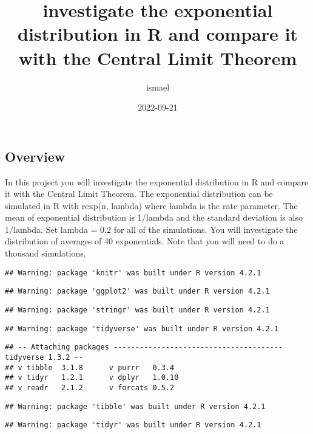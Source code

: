 \documentclass[
]{article}
\title{investigate the exponential distribution in R and compare it with
the Central Limit Theorem}
\author{ismael}
\date{2022-09-21}
\begin{document}
\maketitle

\hypertarget{overview}{%
\subsection{Overview}\label{overview}}

In this project you will investigate the exponential distribution in R
and compare it with the Central Limit Theorem. The exponential
distribution can be simulated in R with rexp(n, lambda) where lambda is
the rate parameter. The mean of exponential distribution is 1/lambda and
the standard deviation is also 1/lambda. Set lambda = 0.2 for all of the
simulations. You will investigate the distribution of averages of 40
exponentials. Note that you will need to do a thousand simulations.

\begin{verbatim}
## Warning: package 'knitr' was built under R version 4.2.1
\end{verbatim}

\begin{verbatim}
## Warning: package 'ggplot2' was built under R version 4.2.1
\end{verbatim}

\begin{verbatim}
## Warning: package 'stringr' was built under R version 4.2.1
\end{verbatim}

\begin{verbatim}
## Warning: package 'tidyverse' was built under R version 4.2.1
\end{verbatim}

\begin{verbatim}
## -- Attaching packages --------------------------------------- tidyverse 1.3.2 --
## v tibble  3.1.8      v purrr   0.3.4 
## v tidyr   1.2.1      v dplyr   1.0.10
## v readr   2.1.2      v forcats 0.5.2
\end{verbatim}

\begin{verbatim}
## Warning: package 'tibble' was built under R version 4.2.1
\end{verbatim}

\begin{verbatim}
## Warning: package 'tidyr' was built under R version 4.2.1
\end{verbatim}
\end{document}
